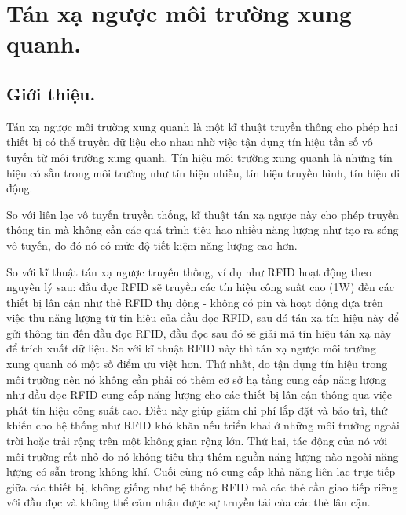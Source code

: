 \documentclass{uetgraduation}
\begin{document}
\section{Tán xạ ngược môi trường xung quanh.}
\subsection{Giới thiệu.}
Tán xạ ngược môi trường xung quanh là một kĩ thuật truyền thông cho phép hai thiết bị có thể truyền dữ liệu cho nhau nhờ việc tận dụng tín hiệu tần số vô tuyến từ môi trường 
xung quanh. Tín hiệu môi trường xung quanh là những tín hiệu có sẵn trong môi trường như tín hiệu nhiễu, tín hiệu truyền hình, tín hiệu di động.

So với liên lạc vô tuyến truyền thống, kĩ thuật tán xạ ngược này cho phép truyền thông tin mà không cần các quá trình tiêu hao nhiều năng lượng như tạo ra sóng vô tuyến, 
do đó nó có mức độ tiết kiệm năng lượng cao hơn. 

So với kĩ thuật tán xạ ngược truyền thống, ví dụ như RFID hoạt động theo nguyên lý sau: đầu đọc RFID sẽ truyền các tín hiệu công suất cao (1W) đến 
các thiết bị lân cận như thẻ RFID thụ động - không có pin và hoạt động dựa trên việc thu năng lượng từ tín hiệu của đầu đọc RFID, sau đó tán xạ tín hiệu này để gửi thông tin
đến đầu đọc RFID, đầu đọc sau đó sẽ giải mã tín hiệu tán xạ này để trích xuất dữ liệu. So với kĩ thuật RFID này thì tán xạ ngược môi trường xung quanh có một số điểm ưu việt hơn.
Thứ nhất, do tận dụng tín hiệu trong môi trường nên nó không cần phải có thêm cơ sở hạ tầng cung cấp năng lượng như đầu đọc RFID cung cấp năng lượng cho các thiết bị lân cận 
thông qua việc phát tín hiệu công suất cao. Điều này giúp giảm chi phí lắp đặt và bảo trì, thứ khiến cho hệ thống như RFID khó khăn nếu triển khai ở những môi trường ngoài trời
hoặc trải rộng trên một không gian rộng lớn. Thứ hai, tác động của nó với môi trường rất nhỏ do nó không tiêu thụ thêm nguồn năng lượng nào ngoài năng lượng có sẵn trong không
khí. Cuối cùng nó cung cấp khả năng liên lạc trực tiếp giữa các thiết bị, không giống như hệ thống RFID mà các thẻ cần giao tiếp riêng với đầu đọc và không thể cảm nhận được sự
truyền tải của các thẻ lân cận.
\end{document}
